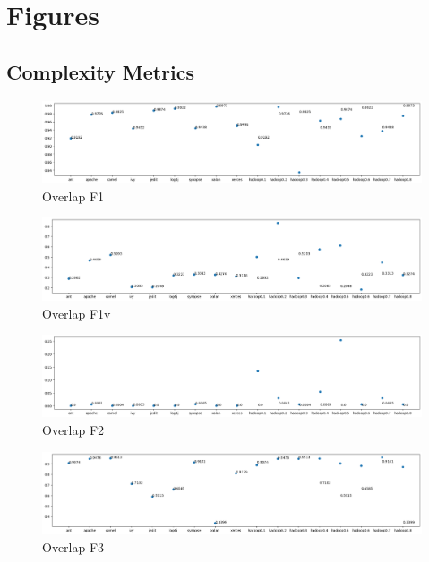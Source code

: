 \chapter{Figures}
\label{chp:figures}

\section{Complexity Metrics}\label{sec:fig-compl-metrics}


\begin{figure}[h!]
    \centering
    \includegraphics[width=\textwidth]{figures/overlap-F1.png}
    \caption{Overlap F1}
    \label{fig:overlap-f1-big}
\end{figure}

\begin{figure}[h!]
    \centering
    \includegraphics[width=\textwidth]{figures/overlap-F1v.png}
    \caption{Overlap F1v}
    \label{fig:overlap-f1v-big}
\end{figure}

\begin{figure}[h!]
    \centering
    \includegraphics[width=\textwidth]{figures/overlap-F2.png}
    \caption{Overlap F2}
    \label{fig:overlap-f2-big}
\end{figure}

\begin{figure}[h!]
    \centering
    \includegraphics[width=\textwidth]{figures/overlap-F3.png}
    \caption{Overlap F3}
    \label{fig:overlap-f3-big}
\end{figure}
    
